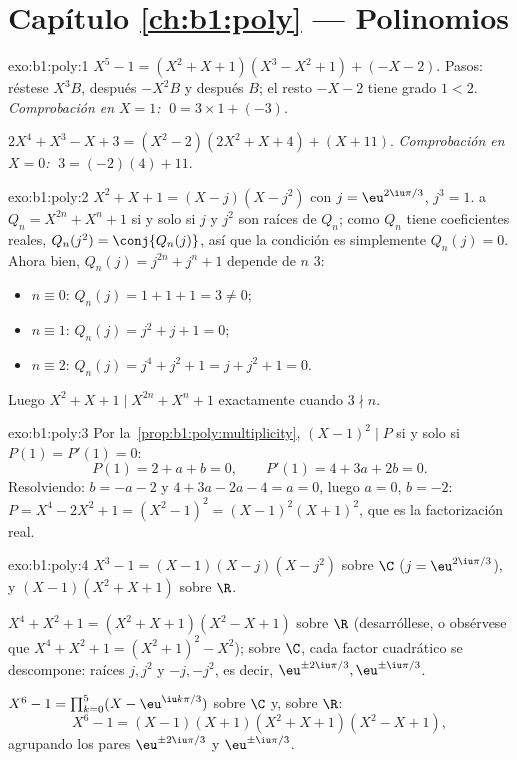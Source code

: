 \section*{Capítulo \ref{ch:b1:poly} --- Polinomios}

\begin{solution}{exo:b1:poly:1}
$X^5 - 1 = (X^2 + X + 1)(X^3 - X^2 + 1) + (-X - 2)$. Pasos: réstese
$X^3 B$, después $-X^2 B$ y después $B$; el resto $-X - 2$ tiene grado
$1 < 2$. \emph{Comprobación en $X = 1$:} $\;0 = 3 \times 1 + (-3)$.

$2X^4 + X^3 - X + 3 = (X^2 - 2)(2X^2 + X + 4) + (X + 11)$.
\emph{Comprobación en $X = 0$:} $\;3 = (-2)(4) + 11$.
\end{solution}

\begin{solution}{exo:b1:poly:2}
$X^2 + X + 1 = (X - j)(X - j^2)$ con $j = \eu^{2\iu\pi/3}$,
$j^3 = 1$.  a $Q_n = X^{2n} + X^n + 1$ si y solo si $j$ y $j^2$
son raíces de $Q_n$; como $Q_n$ tiene coeficientes reales,
$Q_n(j^2) = \conj{Q_n(j)}$, así que la condición es simplemente
$Q_n(j) = 0$. Ahora bien, $Q_n(j) = j^{2n} + j^n + 1$ depende de $n$
 $3$:
\begin{itemize}
  \item $n \equiv 0$: $Q_n(j) = 1 + 1 + 1 = 3 \neq 0$;
  \item $n \equiv 1$: $Q_n(j) = j^2 + j + 1 = 0$;
  \item $n \equiv 2$: $Q_n(j) = j^4 + j^2 + 1 = j + j^2 + 1 = 0$.
\end{itemize}
Luego $X^2 + X + 1 \mid X^{2n} + X^n + 1$ exactamente cuando $3 \nmid n$.
\end{solution}

\begin{solution}{exo:b1:poly:3}
Por la~\cref{prop:b1:poly:multiplicity}, $(X-1)^2 \mid P$ si y solo si
$P(1) = P'(1) = 0$:
\[
P(1) = 2 + a + b = 0, \qquad P'(1) = 4 + 3a + 2b = 0 .
\]
Resolviendo: $b = -a - 2$ y $4 + 3a - 2a - 4 = a = 0$, luego $a = 0$,
$b = -2$: $P = X^4 - 2X^2 + 1 = (X^2 - 1)^2 = (X-1)^2 (X+1)^2$, que es
la factorización real.
\end{solution}

\begin{solution}{exo:b1:poly:4}
$X^3 - 1 = (X - 1)(X - j)(X - j^2)$ sobre $\C$
($j = \eu^{2\iu\pi/3}$), y $(X - 1)(X^2 + X + 1)$ sobre $\R$.

$X^4 + X^2 + 1 = (X^2 + X + 1)(X^2 - X + 1)$ sobre $\R$ (desarróllese,
o obsérvese que $X^4 + X^2 + 1 = (X^2+1)^2 - X^2$); sobre $\C$, cada
factor cuadrático se descompone: raíces $j, j^2$ y $-j, -j^2$, es
decir, $\eu^{\pm 2\iu\pi/3}, \eu^{\pm\iu\pi/3}$.

$X^6 - 1 = \prod_{k=0}^{5} (X - \eu^{\iu k\pi/3})$ sobre $\C$ y, sobre
$\R$:
\[
X^6 - 1 = (X-1)(X+1)(X^2 + X + 1)(X^2 - X + 1),
\]
agrupando los pares  $\eu^{\pm 2\iu\pi/3}$ y
$\eu^{\pm \iu\pi/3}$.
\end{solution}

